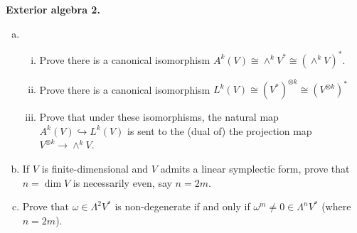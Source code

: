 \documentclass{article}
\newenvironment{problem}[2][Problem]{\begin{trivlist}
\item[\hskip \labelsep {\bfseries #1}\hskip \labelsep {\bfseries #2.}]}{\end{trivlist}}
\begin{document}
\begin{problem}{3} \textbf{Exterior algebra 2.}
  \begin{enumerate}[(a)]
    \item \begin{enumerate}[(i)]
      \item Prove there is a canonical isomorphism $A^k(V) \cong \wedge^kV^* \cong (\wedge^kV)^*$.
      \item Prove there is a canonical isomorphism $L^k(V) \cong (V^*)^{\otimes k} \cong (V^{\otimes k})^*$
      \item Prove that under these isomorphisms, the natural map
        $A^k(V) \hookrightarrow L^k(V)$ is sent to the (dual of) the projection
        map $V^{\otimes k} \rightarrow \wedge^kV$.
    \end{enumerate}
    \item If $V$ is finite-dimensional and $V$ admits a linear symplectic form,
      prove that $n = \dim V$ is necessarily even, say $n = 2m$.
    \item Prove that $\omega \in \Lambda^2V^*$ is non-degenerate if and only if
    $\omega^m \not= 0 \in \Lambda^nV^*$ (where $n = 2m$).
  \end{enumerate}
\end{problem}
\end{document}
